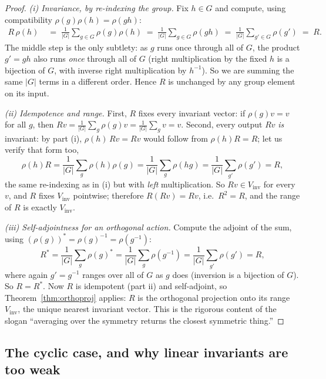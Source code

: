 \begin{proof}
\emph{(i) Invariance, by re-indexing the group.} Fix $h \in G$ and compute, using
compatibility $\rho(g)\rho(h) = \rho(gh)$:
\begin{align*}
  R\,\rho(h)
    \;&=\; \frac{1}{|G|}\sum_{g \in G} \rho(g)\rho(h)
    \;=\; \frac{1}{|G|}\sum_{g \in G} \rho(g h)
    \;=\; \frac{1}{|G|}\sum_{g' \in G} \rho(g')
    \;=\; R .
\end{align*}
The middle step is the only subtlety: as $g$ runs once through all of $G$, the product
$g' = g h$ also runs \emph{once} through all of $G$ (right multiplication by the fixed
$h$ is a bijection of $G$, with inverse right multiplication by $h^{-1}$). So we are
summing the same $|G|$ terms in a different order. Hence $R$ is unchanged by any group
element on its input.

\emph{(ii) Idempotence and range.} First, $R$ fixes every invariant vector: if
$\rho(g)v = v$ for all $g$, then $Rv = \tfrac{1}{|G|}\sum_g \rho(g) v =
\tfrac{1}{|G|}\sum_g v = v$. Second, every output $Rv$ \emph{is} invariant: by part
(i), $\rho(h)\,Rv = R v$ would follow from $\rho(h) R = R$; let us verify that form too,
\[
  \rho(h) R = \frac{1}{|G|}\sum_g \rho(h)\rho(g) = \frac{1}{|G|}\sum_g \rho(hg)
            = \frac{1}{|G|}\sum_{g'} \rho(g') = R ,
\]
the same re-indexing as in (i) but with \emph{left} multiplication. So $Rv \in
V_{\mathrm{inv}}$ for every $v$, and $R$ fixes $V_{\mathrm{inv}}$ pointwise; therefore
$R(Rv) = Rv$, i.e.\ $R^2 = R$, and the range of $R$ is exactly $V_{\mathrm{inv}}$.

\emph{(iii) Self-adjointness for an orthogonal action.} Compute the adjoint of the sum,
using $(\rho(g))^\ast = \rho(g)^{-1} = \rho(g^{-1})$:
\[
  R^\ast = \frac{1}{|G|}\sum_g \rho(g)^\ast
         = \frac{1}{|G|}\sum_g \rho(g^{-1})
         = \frac{1}{|G|}\sum_{g'} \rho(g')
         = R ,
\]
where again $g' = g^{-1}$ ranges over all of $G$ as $g$ does (inversion is a bijection
of $G$). So $R = R^\ast$. Now $R$ is idempotent (part ii) and self-adjoint, so
Theorem~\ref{thm:orthoproj} applies: $R$ is the orthogonal projection onto its range
$V_{\mathrm{inv}}$, the unique nearest invariant vector. This is the rigorous content of
the slogan ``averaging over the symmetry returns the closest symmetric thing.''
\end{proof}

\subsection{The cyclic case, and why linear invariants are too weak}

